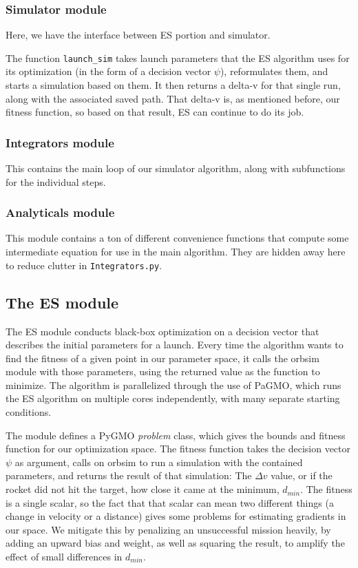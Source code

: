\subsubsection{Simulator module}

Here, we have the interface between ES portion and simulator.

\noindent The function \texttt{launch\_sim} takes launch parameters that the ES algorithm uses for its optimization (in the form of a decision vector \(\psi\)), reformulates them, and starts a simulation based on them. It then returns a delta-v for that single run, along with the associated saved path. That delta-v is, as mentioned before, our fitness function, so based on that result, ES can continue to do its job.

\subsubsection{Integrators module}

This contains the main loop of our simulator algorithm, along with subfunctions for the individual steps.

\subsubsection{Analyticals module}

This module contains a ton of different convenience functions that compute some intermediate equation for use in the main algorithm. They are hidden away here to reduce clutter in \texttt{Integrators.py}.

\subsection{The ES module}

The ES module conducts black-box optimization on a decision vector that describes the initial parameters for a launch. Every time the algorithm wants to find the fitness of a given point in our parameter space, it calls the orbsim module with those parameters, using the returned value as the function to minimize. The algorithm is parallelized through the use of PaGMO, which runs the ES algorithm on multiple cores independently, with many separate starting conditions.

The module defines a PyGMO \emph{problem} class, which gives the bounds and fitness function for our optimization space. The fitness function takes the decision vector \(\psi\) as argument, calls on orbsim to run a simulation with the contained parameters, and returns the result of that simulation: The \(\Delta v\) value, or if the rocket did not hit the target, how close it came at the minimum, \(d_{min}\). The fitness is a single scalar, so the fact that that scalar can mean two different things (a change in velocity or a distance) gives some problems for estimating gradients in our space. We mitigate this by penalizing an unsuccessful mission heavily, by adding an upward bias and weight, as well as squaring the result, to amplify the effect of small differences in \(d_{min}\).

